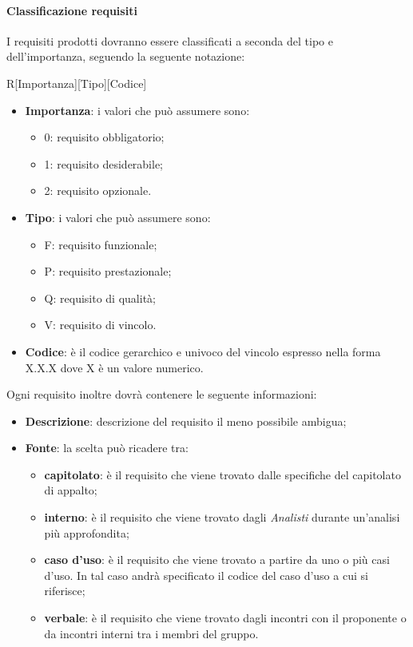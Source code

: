 			\paragraph{Classificazione requisiti}
I requisiti prodotti dovranno essere classificati a seconda del tipo e dell'importanza, seguendo la seguente notazione:
				\begin{center}
					R[Importanza][Tipo][Codice]
				\end{center}
			\noindent
				\begin{itemize}
					\item \textbf{Importanza}: i valori che può assumere sono:
						\begin{itemize}
							\item 0: requisito obbligatorio;
							\item 1: requisito desiderabile;
							\item 2: requisito opzionale.
						\end{itemize}
					\item \textbf{Tipo}: i valori che può assumere sono:
						\begin{itemize}
							\item F: requisito funzionale;
							\item P: requisito prestazionale;
							\item Q: requisito di qualità;
							\item V: requisito di vincolo.
						\end{itemize}
					\item \textbf{Codice}: è il codice gerarchico e univoco del vincolo espresso nella forma X.X.X dove X è un valore numerico.
				\end{itemize}
			\noindent
			Ogni requisito inoltre dovrà contenere le seguente informazioni:
				\begin{itemize}
					\item \textbf{Descrizione}: descrizione del requisito il meno possibile ambigua;
					\item \textbf{Fonte}: la scelta può ricadere tra:
						\begin{itemize}
							\item \textbf{capitolato}: è il requisito che viene trovato dalle specifiche del capitolato di appalto;
							\item \textbf{interno}: è il requisito che viene trovato dagli \emph{Analisti} durante un'analisi più approfondita;
							\item \textbf{caso d'uso}: è il requisito che viene trovato a partire da uno o più casi d'uso. In tal caso andrà specificato il codice del caso d'uso a cui si riferisce;
							\item \textbf{verbale}: è il requisito che viene trovato dagli incontri con il proponente\gloss{} o da incontri interni tra i membri del gruppo.
						\end{itemize}
				\end{itemize}
			
